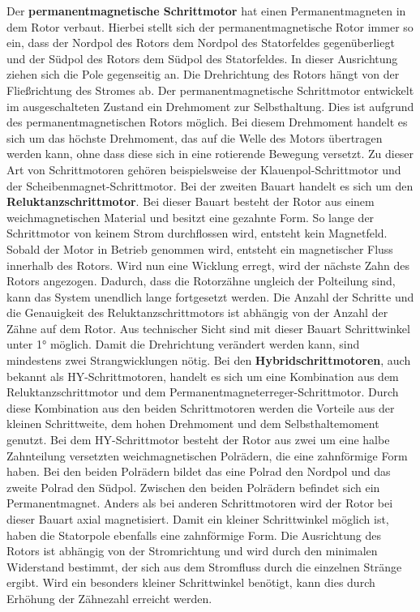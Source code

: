 Der \textbf{permanentmagnetische Schrittmotor} hat einen Permanentmagneten in dem Rotor verbaut. Hierbei stellt sich der permanentmagnetische Rotor immer so ein, dass der Nordpol des Rotors dem Nordpol des Statorfeldes gegenüberliegt und der Südpol des Rotors dem Südpol des Statorfeldes. In dieser Ausrichtung ziehen sich die Pole gegenseitig an. Die Drehrichtung des Rotors hängt von der Fließrichtung des Stromes ab. Der permanentmagnetische Schrittmotor entwickelt im ausgeschalteten Zustand ein Drehmoment zur Selbsthaltung. Dies ist aufgrund des permanentmagnetischen Rotors möglich. Bei diesem Drehmoment handelt es sich um das höchste Drehmoment, das auf die Welle des Motors übertragen werden kann, ohne dass diese sich in eine rotierende Bewegung versetzt. Zu dieser Art von Schrittmotoren gehören beispielsweise der Klauenpol-Schrittmotor und der Scheibenmagnet-Schrittmotor. Bei der zweiten Bauart handelt es sich um den \textbf{Reluktanzschrittmotor}. Bei dieser Bauart besteht der Rotor aus einem weichmagnetischen Material und besitzt eine gezahnte Form. So lange der Schrittmotor von keinem Strom durchflossen wird, entsteht kein Magnetfeld. Sobald der Motor in Betrieb genommen wird, entsteht ein magnetischer Fluss innerhalb des Rotors. Wird nun eine Wicklung erregt, wird der nächste Zahn des Rotors angezogen. Dadurch, dass die Rotorzähne ungleich der Polteilung sind, kann das System unendlich lange fortgesetzt werden. Die Anzahl der Schritte und die Genauigkeit des Reluktanzschrittmotors ist abhängig von der Anzahl der Zähne auf dem Rotor. Aus technischer Sicht sind mit dieser Bauart Schrittwinkel unter 1° möglich. Damit die Drehrichtung verändert werden kann, sind mindestens zwei Strangwicklungen nötig. Bei den \textbf{Hybridschrittmotoren}, auch bekannt als HY-Schrittmotoren, handelt es sich um eine Kombination aus dem Reluktanzschrittmotor und dem Permanentmagneterreger-Schrittmotor. Durch diese Kombination aus den beiden Schrittmotoren werden die Vorteile aus der kleinen Schrittweite, dem hohen Drehmoment und dem Selbsthaltemoment genutzt. Bei dem HY-Schrittmotor besteht der Rotor aus zwei um eine halbe Zahnteilung versetzten weichmagnetischen Polrädern, die eine zahnförmige Form haben. Bei den beiden Polrädern bildet das eine Polrad den Nordpol und das zweite Polrad den Südpol. Zwischen den beiden Polrädern befindet sich ein Permanentmagnet. Anders als bei anderen Schrittmotoren wird der Rotor bei dieser Bauart axial magnetisiert. Damit ein kleiner Schrittwinkel möglich ist, haben die Statorpole ebenfalls eine zahnförmige Form. Die Ausrichtung des Rotors ist abhängig von der Stromrichtung und wird durch den minimalen Widerstand bestimmt, der sich aus dem Stromfluss durch die einzelnen Stränge ergibt. Wird ein besonders kleiner Schrittwinkel benötigt, kann dies durch Erhöhung der Zähnezahl erreicht werden. \cite{Schroder.2021} \cite{Hagl.2021} \cite{Babiel.2023}

